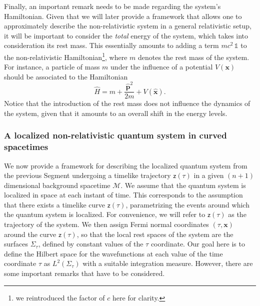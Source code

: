 \documentclass[letterpaper,12pt,titlepage,oneside,final]{book}
\newcommand{\openone}{\mathds{1}}
\newcommand{\mf}{\mathsf}%
\begin{document}
Finally, an important remark needs to be made regarding the system's Hamiltonian. Given that we will later provide a framework that allows one to approximately describe the non-relativistic system in a general relativistic setup, it will be important to consider the \emph{total} energy of the system, which takes into consideration its rest mass. This essentially amounts to adding a term $m c^2 \,\openone$ to the non-relativistic Hamiltonian\footnote{we reintroduced the factor of $c$ here for clarity.}, where $m$ denotes the rest mass of the system. For instance, a particle of mass $m$ under the influence of a potential $V(\bm x)$ should be associated to the Hamiltonian
\begin{equation}\label{eq:HO}
    \hat{H} = m + \frac{\hat{\bm p}^2}{2m} + V(\hat{\bm x}).
\end{equation}
Notice that the introduction of the rest mass does not influence the dynamics of the system, given that it amounts to an overall shift in the energy levels.







\subsubsection*{A localized non-relativistic quantum system in curved spacetimes}\label{sub:main}

We now provide a framework for describing the localized quantum system from the previous Segment undergoing a timelike trajectory $\mf z(\tau)$ in a given $(n+1)$ dimensional background spacetime $\mathcal{M}$. We assume that the quantum system is localized in space at each instant of time. This corresponds to the assumption that there exists a timelike curve $\mf z(\tau)$, parametrizing the events around which the quantum system is localized. For convenience, we will refer to $\mf z(\tau)$ as the trajectory of the system. We then assign Fermi normal coordinates $(\tau,\bm x)$ around the curve $\mf z(\tau)$, so that the local rest spaces of the system are the surfaces $\Sigma_\tau$, defined by constant values of the $\tau$ coordinate. Our goal here is to define the Hilbert space for the wavefunctions at each value of the time coordinate $\tau$ as $L^2(\Sigma_\tau)$ with a suitable integration measure. However, there are some important remarks that have to be considered. 
\end{document}
